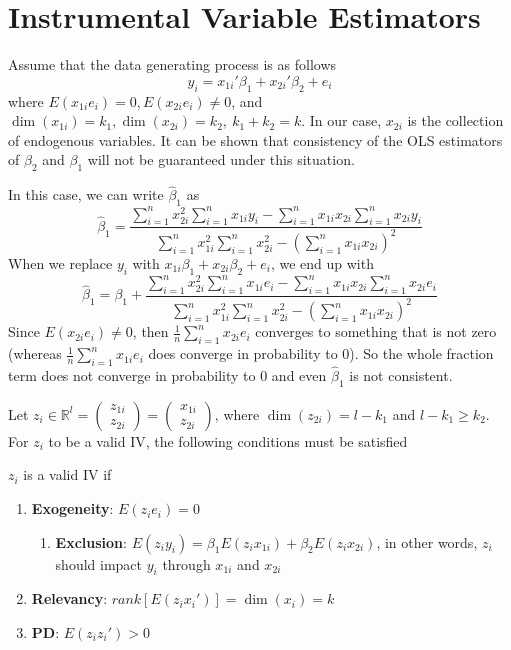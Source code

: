 \section{Instrumental Variable Estimators}
Assume that the data generating process is as follows
\[
y_i = x_{1i}'\beta_1+x_{2i}'\beta_2+e_i
\]
where $E(x_{1i}e_i)=0, E(x_{2i}e_i)\neq0$, and $\dim(x_{1i})=k_1, \dim(x_{2i})=k_2,\ k_1+k_2=k$. In our case, $x_{2i}$ is the collection of endogenous variables. It can be shown that consistency of the OLS estimators of $\beta_2$ and $\beta_1$ will not be guaranteed under this situation.
\begin{mdframed}[backgroundcolor=yellow!5] 
\begin{example}[When $k_1=k_2=1$]
In this case, we can write $\hat{\beta}_1$ as
\[
\hat{\beta}_1=\frac{\sum_{i=1}^n x_{2i}^2\sum_{i=1}^n x_{1i}y_i-\sum_{i=1}^n x_{1i}x_{2i}\sum_{i=1}^nx_{2i}y_i}{\sum_{i=1}^n x_{1i}^2\sum_{i=1}^nx_{2i}^2-(\sum_{i=1}^nx_{1i}x_{2i})^2}
\]
When we replace $y_i$ with $x_{1i}\beta_1+x_{2i}\beta_2+e_i$, we end up with
\[
\hat{\beta}_1=\beta_1+\frac{\sum_{i=1}^n x_{2i}^2\sum_{i=1}^n x_{1i}e_i-\sum_{i=1}^n x_{1i}x_{2i}\sum_{i=1}^nx_{2i}e_i}{\sum_{i=1}^n x_{1i}^2\sum_{i=1}^nx_{2i}^2-(\sum_{i=1}^nx_{1i}x_{2i})^2}
\]
Since $E(x_{2i}e_i)\neq0$, then $\frac{1}{n}\sum_{i=1}^nx_{2i}e_i$ converges to something that is not zero (whereas $\frac{1}{n}\sum_{i=1}^nx_{1i}e_i$ does converge in probability to 0). So the whole fraction term does not converge in probability to 0 and even $\hat{\beta}_1$ is not consistent. 
\end{example}
\end{mdframed}
\par
Let $z_i\in\mathbb{R}^l = \begin{pmatrix}z_{1i} \\ z_{2i}\end{pmatrix}=\begin{pmatrix}x_{1i} \\ z_{2i}\end{pmatrix}$, where $\dim(z_{2i})=l-k_1$ and $l-k_1\geq k_2$. For $z_i$ to be a valid IV, the following conditions must be satisfied
\begin{mdframed}[backgroundcolor=blue!5] 
\begin{definition}[IV conditions]
$z_i$ is a valid IV if
\begin{enumerate}
\item \textbf{Exogeneity}: $E(z_ie_i)=0$
\begin{enumerate}
\item \textbf{Exclusion}: $E(z_iy_i)=\beta_1E(z_ix_{1i})+\beta_2E(z_ix_{2i})$, in other words, $z_i$ should impact $y_i$ through $x_{1i}$ and $x_{2i}$
\end{enumerate}
\item \textbf{Relevancy}: $rank[E(z_ix_i')]=\dim(x_i)=k$
\item \textbf{PD}: $E(z_iz_i')>0$
\end{enumerate}
\end{definition}
\end{mdframed}
